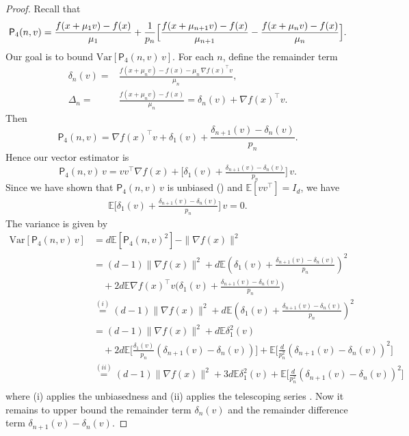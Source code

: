 \documentclass{article}
\newcommand{\Var}{\mathrm{Var}}
\newcommand{\EE}{\mathbb{E}}
\theoremstyle{definition}
\theoremstyle{plain}
\theoremstyle{remark}
\begin{document}
\begin{proof}
Recall that
\[
\mathsf P_4(n,v)
= \frac{f(x+\mu_1v)-f(x)}{\mu_1}
+ \frac1{p_n}\Bigl[\frac{f(x+\mu_{n+1}v)-f(x)}{\mu_{n+1}}
- \frac{f(x+\mu_nv)-f(x)}{\mu_n}\Bigr].
\]
Our goal is to bound \(\Var[\mathsf P_4(n,v)\,v]\). For each \(n\), define the remainder term
\begin{align*}
    \delta_n(v)
=&\frac{f(x+\mu_n v)-f(x)-\mu_n\,\nabla f(x)^\top v}{\mu_n}, \\
 \Delta_n =& \frac{f(x+\mu_n v)-f(x) }{\mu_n} = \delta_n(v) + \nabla f(x)^\top v.
\end{align*} 
Then
\[
\mathsf P_4(n,v)
= \nabla f(x)^\top v
+ \delta_1(v)
+ \frac{\delta_{n+1}(v)-\delta_n(v)}{p_n}.
\]
Hence our vector estimator is
\[
\mathsf P_4(n,v)\,v
= vv^\top  \nabla f(x) + \bigl[\delta_1(v)+\tfrac{\delta_{n+1}(v)-\delta_n(v)}{p_n}\bigr]\,v.
\]
Since we have shown that $\mathsf P_4(n,v)\,v$ is unbiased () and $\EE[vv^\top]=I_d$, we have 
\begin{align}\label{eq:1}
    \EE \bigl[\delta_1(v)+\tfrac{\delta_{n+1}(v)-\delta_n(v)}{p_n}\bigr]\,v = 0.
\end{align}
The variance is given by
\begin{align*}
    \Var[\mathsf P_4(n,v)\,v  ] &= d \EE [\mathsf P_4(n,v)^2 ] - \|\nabla f(x) \|^2 \\ 
    &= (d-1)\|\nabla f(x) \|^2  + d \EE\left(\delta_1(v)
+ \frac{\delta_{n+1}(v)-\delta_n(v)}{p_n} \right)^2  \\ 
&\quad + 2 d \EE \nabla f(x)^\top v \Big(\delta_1(v) + \frac{\delta_{n+1}(v)-\delta_n(v)}{p_n}  \Big) \\
    &\overset{(i)}{=} (d-1)\|\nabla f(x) \|^2  +d \EE\left(\delta_1(v)
+ \frac{\delta_{n+1}(v)-\delta_n(v)}{p_n} \right)^2  \\  
&= (d-1)\|\nabla f(x) \|^2  + d \EE \delta_1^2(v) \\ 
& \quad + 2 d \EE \Big[\frac{\delta_1(v)}{p_n} \left( \delta_{n+1}(v)-\delta_n(v)\right)  \Big]+    \EE \Big[\frac{d}{p_n^2} \left( \delta_{n+1}(v)-\delta_n(v)\right)^2 \Big] \\ 
&\overset{(ii)}{=} (d-1)\|\nabla f(x) \|^2  + 3d\EE \delta_1^2(v)  +    \EE \Big[\frac{d}{p_n^2} \left( \delta_{n+1}(v)-\delta_n(v)\right)^2 \Big] \\ 
\end{align*}
where (i) applies the unbiasedness  and (ii) applies the telescoping series . Now it remains to upper bound the remainder term $\delta_n(v)$ and the  remainder difference term $\delta_{n+1}(v) - \delta_{n}(v) $.

\end{proof}
\end{document}

